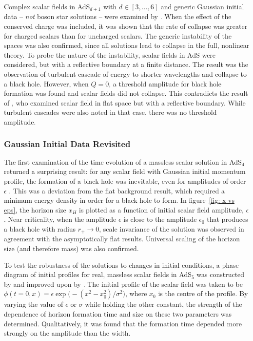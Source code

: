 \documentclass[../PhD.tex]{subfiles}
\begin{document}
Complex scalar fields in AdS$_{d+1}$ with $d \in [3,\ldots,6]$ and generic Gaussian initial data -- \emph{not} boson star solutions -- were examined by \cite{1210.0890}. When the effect of the conserved charge was included, it was shown that the rate of collapse was greater for charged scalars than for uncharged scalars. The generic instability of the spaces was also confirmed, since all solutions lead to collapse in the full, nonlinear theory. To probe the nature of the instability, scalar fields in AdS were considered, but with a reflective boundary at a finite distance. The result was the observation of turbulent cascade of energy to shorter wavelengths and collapse to a black hole. However, when $Q = 0$, a threshold amplitude for black hole formation was found and scalar fields did not collapse. This contradicts the result of \cite{1208.2934}, who examined scalar field in flat space but with a reflective boundary. While turbulent cascades were also noted in that case, there was no threshold amplitude.

\subsubsection{Gaussian Initial Data Revisited}

The first examination of the time evolution of a massless scalar solution in AdS$_4$ returned a surprising result: for any scalar field with Gaussian initial momentum profile, the formation of a black hole was inevitable, even for amplitudes of order $\epsilon$ \cite{1104.3702}. This was a deviation from the flat background result, which required a minimum energy density in order for a black hole to form. In figure~\ref{fig: x vs eps}, the horizon size $x_H$ is plotted as a function of initial scalar field amplitude, $\epsilon$. Near criticality, when the amplitude $\epsilon$ is close to the amplitude $\epsilon_0$ that produces a black hole with radius $r_+ \to 0$, scale invariance of the solution was observed in agreement with the asymptotically flat results. Universal scaling of the horizon size (and therefore mass) was also confirmed. 

To test the robustness of the solutions to changes in initial conditions, a phase diagram of initial profiles for real, massless scalar fields in AdS$_5$ was constructed by \cite{1106.2339} and improved upon by \cite{1110.5823}. The initial profile of the scalar field was taken to be $\phi(t=0, x) = \epsilon \exp \big( -(x^2 - x_0^2) / \sigma^2 \big)$, where $x_0$ is the centre of the profile. By varying the value of $\epsilon$ or $\sigma$ while holding the other constant, the strength of the dependence of horizon formation time and size on these two parameters was determined. Qualitatively, it was found that the formation time depended more strongly on the amplitude than the width. 
\end{document}
